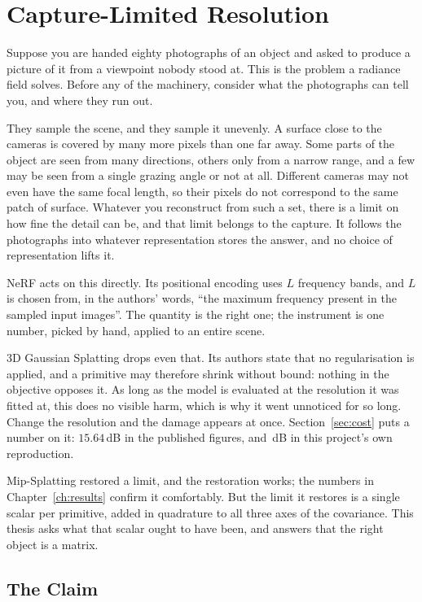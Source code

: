 \chapter{Capture-Limited Resolution}
\label{ch:intro}

Suppose you are handed eighty photographs of an object and asked to produce a
picture of it from a viewpoint nobody stood at. This is the problem a radiance field solves. Before any of the machinery, consider what the photographs can tell you, and
where they run out.

They sample the scene, and they sample it unevenly. A surface close to the
cameras is covered by many more pixels than one far away. Some parts of the
object are seen from many directions, others only from a narrow range, and a few
may be seen from a single grazing angle or not at all. Different cameras may not
even have the same focal length, so their pixels do not correspond to the same
patch of surface. Whatever you reconstruct from such a set, there is a limit on
how fine the detail can be, and that limit belongs to the capture. It follows the photographs into whatever
representation stores the answer, and no choice of representation lifts it.

NeRF acts on this directly. Its positional encoding uses $L$ frequency bands,
and $L$ is chosen from, in the authors' words, ``the maximum frequency present
in the sampled input images''. The quantity is the right one; the instrument is
one number, picked by hand, applied to an entire scene.

3D Gaussian Splatting drops even that. Its authors state that no regularisation
is applied, and a primitive may therefore shrink without bound: nothing in the
objective opposes it. As long as the
model is evaluated at the resolution it was fitted at, this does no visible harm, which is why it went unnoticed for so long. Change the
resolution and the damage appears at once. Section~\ref{sec:cost} puts a number
on it: $15.64$\,dB in the published figures, and \StmtArmBDrop\,dB in this
project's own reproduction.

Mip-Splatting restored a limit, and the restoration works; the numbers in
Chapter~\ref{ch:results} confirm it comfortably. But the limit it restores is a
single scalar per primitive, added in quadrature to all three axes of the
covariance. This thesis asks what that scalar ought to have been, and answers that the right
object is a matrix.

\section{The Claim}

